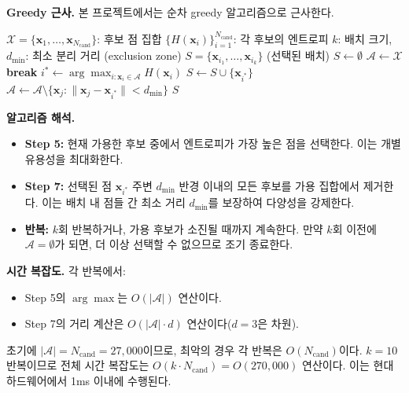 \documentclass[11pt]{article}
\begin{document}
\textbf{Greedy 근사.} 본 프로젝트에서는 순차 greedy 알고리즘으로 근사한다.

\begin{algorithm}[htbp]
\caption{Greedy Batch Selection with Diversity}\label{alg:greedy-batch}
\begin{algorithmic}[1]
\Require $\mathcal{X} = \{\mathbf{x}_1, \dots, \mathbf{x}_{N_{\text{cand}}}\}$: 후보 점 집합
\Require $\{H(\mathbf{x}_i)\}_{i=1}^{N_{\text{cand}}}$: 각 후보의 엔트로피
\Require $k$: 배치 크기, $d_{\min}$: 최소 분리 거리 (exclusion zone)
\Ensure $S = \{\mathbf{x}_{i_1}, \dots, \mathbf{x}_{i_k}\}$ (선택된 배치)
\State $S \leftarrow \emptyset$ 
\State $\mathcal{A} \leftarrow \mathcal{X}$ 
   \textbf{break} \EndIf
  \State $i^* \leftarrow \arg\max_{i : \mathbf{x}_i \in \mathcal{A}} H(\mathbf{x}_i)$ 
  \State $S \leftarrow S \cup \{\mathbf{x}_{i^*}\}$ 
  \State $\mathcal{A} \leftarrow \mathcal{A} \setminus \{\mathbf{x}_j : \|\mathbf{x}_j - \mathbf{x}_{i^*}\| < d_{\min}\}$ 
\EndFor
\State \Return $S$
\end{algorithmic}
\end{algorithm}

\textbf{알고리즘 해석.}

\begin{itemize}
  \item \textbf{Step 5:} 현재 가용한 후보 중에서 엔트로피가 가장 높은 점을 선택한다. 이는 개별 유용성을 최대화한다.
  \item \textbf{Step 7:} 선택된 점 $\mathbf{x}_{i^*}$ 주변 $d_{\min}$ 반경 이내의 모든 후보를 가용 집합에서 제거한다. 이는 배치 내 점들 간 최소 거리 $d_{\min}$를 보장하여 다양성을 강제한다.
  \item \textbf{반복:} $k$회 반복하거나, 가용 후보가 소진될 때까지 계속한다. 만약 $k$회 이전에 $\mathcal{A} = \emptyset$가 되면, 더 이상 선택할 수 없으므로 조기 종료한다.
\end{itemize}

\textbf{시간 복잡도.} 각 반복에서:
\begin{itemize}
  \item Step 5의 $\arg\max$는 $O(|\mathcal{A}|)$ 연산이다.
  \item Step 7의 거리 계산은 $O(|\mathcal{A}| \cdot d)$ 연산이다($d = 3$은 차원).
\end{itemize}

초기에 $|\mathcal{A}| = N_{\text{cand}} = 27{,}000$이므로, 최악의 경우 각 반복은 $O(N_{\text{cand}})$이다. $k = 10$ 반복이므로 전체 시간 복잡도는 $O(k \cdot N_{\text{cand}}) = O(270{,}000)$ 연산이다. 이는 현대 하드웨어에서 1ms 이내에 수행된다.
\end{document}

